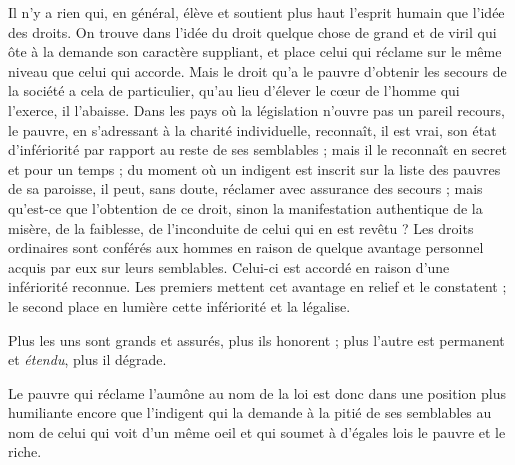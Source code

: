 \documentclass[french,twoside]{book} %
\begin{document}
Il n’y a rien qui, en général, élève et soutient plus haut l’esprit humain que l’idée des droits. On trouve dans l’idée du droit quelque chose de grand et de viril qui ôte à la demande son caractère suppliant, et place celui qui réclame sur le même niveau que celui qui accorde. Mais le droit qu’a le pauvre d’obtenir les secours de la société a cela de particulier, qu’au lieu d’élever le cœur de l’homme qui l’exerce, il l’abaisse. Dans les pays où la législation n’ouvre pas un pareil recours, le pauvre, en s’adressant à la charité individuelle, reconnaît, il est vrai, son état d’infériorité par rapport au reste de ses semblables ; mais il le reconnaît en secret et pour un temps ; du moment où un indigent est inscrit sur la liste des pauvres de sa paroisse, il peut, sans doute, réclamer avec assurance des secours ; mais qu’est-ce que l’obtention de ce droit, sinon la manifestation authentique de la misère, de la faiblesse, de l’inconduite de celui qui en est revêtu ? Les droits ordinaires sont conférés aux hommes en raison de quelque avantage personnel acquis par eux sur leurs semblables. Celui-ci est accordé en raison d’une infériorité reconnue. Les premiers mettent cet avantage en relief et le constatent ; le second place en lumière cette infériorité et la légalise.\par
Plus les uns sont grands et assurés, plus ils honorent ; plus l’autre est permanent et \emph{étendu}, plus il dégrade.\par
Le pauvre qui réclame l’aumône au nom de la loi est donc dans une position plus humiliante encore que l’indigent qui la demande à la pitié de ses semblables au nom de celui qui voit d’un même oeil et qui soumet à d’égales lois le pauvre et le riche.\par
\end{document}
